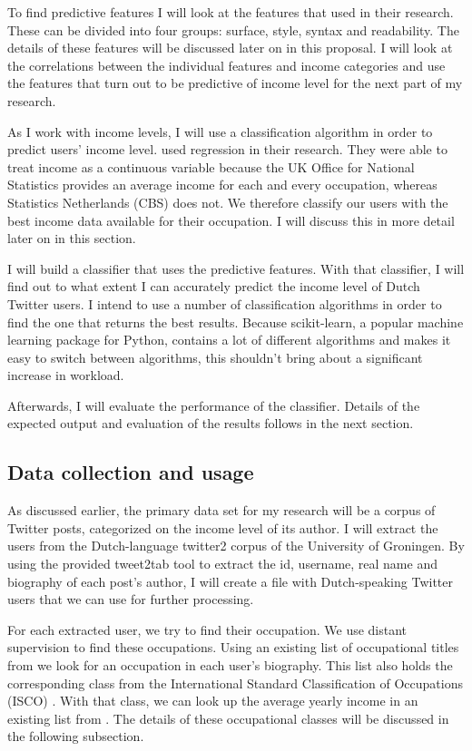 \documentclass[11pt, a4paper]{article}
\begin{document}
To find predictive features I will look at the features that \citet{flekova} used in their research. These can be divided into four groups: surface, style, syntax and readability.  The details of these features will be discussed later on in this proposal. I will look at the correlations between the individual features and income categories and use the features that turn out to be predictive of income level for the next part of my research.

As I work with income levels, I will use a classification algorithm in order to predict users' income level. \citet{flekova} used regression in their research. They were able to treat income as a continuous variable because the UK Office for National Statistics provides an average income for each and every occupation, whereas Statistics Netherlands (CBS) does not.  We therefore classify our users with the best income data available for their occupation. I will discuss this in more detail later on in this section.

I will build a classifier that uses the predictive features. With that classifier, I will find out to what extent I can accurately predict the income level of Dutch Twitter users. I intend to use a number of classification algorithms in order to find the one that returns the best results. Because scikit-learn, a popular machine learning package for Python, contains a lot of different algorithms and makes it easy to switch between algorithms, this shouldn't bring about a significant increase in workload.

Afterwards, I will evaluate the performance of the classifier. Details of the expected output and evaluation of the results follows in the next section.

\subsection{Data collection and usage}
As discussed earlier, the primary data set for my research will be a corpus of Twitter posts, categorized on the income level of its author. I will extract the users from the Dutch-language twitter2 corpus of the University of Groningen. By using the provided tweet2tab tool to extract the id, username, real name and biography of each post's author, I will create a file with Dutch-speaking Twitter users that we can use for further processing. 

For each extracted user, we try to find their occupation. We use distant supervision to find these occupations. Using an existing list of occupational titles from \cite{codelijsten} we look for an occupation in each user's biography. This list also holds the corresponding class from the International Standard Classification of Occupations (ISCO) \citep{isco}.  With that class, we can look up the average yearly income in an existing list from \cite{uurlonen}. The details of these occupational classes will be discussed in the following subsection.
\end{document}
